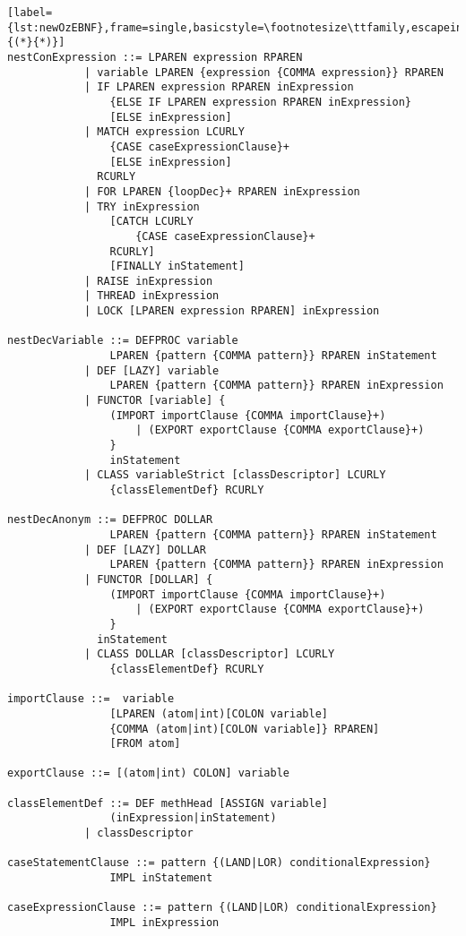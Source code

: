 \begin{lstlisting}[label={lst:newOzEBNF},frame=single,basicstyle=\footnotesize\ttfamily,escapeinside={(*}{*)}]
nestConExpression ::= LPAREN expression RPAREN
            | variable LPAREN {expression {COMMA expression}} RPAREN
            | IF LPAREN expression RPAREN inExpression
                {ELSE IF LPAREN expression RPAREN inExpression}
                [ELSE inExpression]
            | MATCH expression LCURLY
                {CASE caseExpressionClause}+
                [ELSE inExpression]
              RCURLY
            | FOR LPAREN {loopDec}+ RPAREN inExpression
            | TRY inExpression
                [CATCH LCURLY
                    {CASE caseExpressionClause}+
                RCURLY]
                [FINALLY inStatement]
            | RAISE inExpression
            | THREAD inExpression
            | LOCK [LPAREN expression RPAREN] inExpression

nestDecVariable ::= DEFPROC variable
                LPAREN {pattern {COMMA pattern}} RPAREN inStatement
            | DEF [LAZY] variable
                LPAREN {pattern {COMMA pattern}} RPAREN inExpression
            | FUNCTOR [variable] {
                (IMPORT importClause {COMMA importClause}+)
                    | (EXPORT exportClause {COMMA exportClause}+)
                }
                inStatement
            | CLASS variableStrict [classDescriptor] LCURLY
                {classElementDef} RCURLY

nestDecAnonym ::= DEFPROC DOLLAR
                LPAREN {pattern {COMMA pattern}} RPAREN inStatement
            | DEF [LAZY] DOLLAR
                LPAREN {pattern {COMMA pattern}} RPAREN inExpression
            | FUNCTOR [DOLLAR] {
                (IMPORT importClause {COMMA importClause}+)
                    | (EXPORT exportClause {COMMA exportClause}+)
                }
              inStatement
            | CLASS DOLLAR [classDescriptor] LCURLY
                {classElementDef} RCURLY

importClause ::=  variable
                [LPAREN (atom|int)[COLON variable]
                {COMMA (atom|int)[COLON variable]} RPAREN]
                [FROM atom]

exportClause ::= [(atom|int) COLON] variable

classElementDef ::= DEF methHead [ASSIGN variable]
                (inExpression|inStatement)
            | classDescriptor

caseStatementClause ::= pattern {(LAND|LOR) conditionalExpression}
                IMPL inStatement

caseExpressionClause ::= pattern {(LAND|LOR) conditionalExpression}
                IMPL inExpression


\end{lstlisting}
